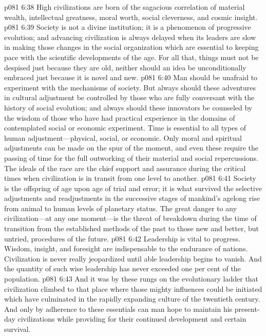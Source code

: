\vs p081 6:38 High civilizations are born of the sagacious correlation of material wealth, intellectual greatness, moral worth, social cleverness, and cosmic insight.
\pc \vs p081 6:39 \bibnobreakspace {} Society is not a divine institution; it is a phenomenon of progressive evolution; and advancing civilization is always delayed when its leaders are slow in making those changes in the social organization which are essential to keeping pace with the scientific developments of the age. For all that, things must not be despised just because they are old, neither should an idea be unconditionally embraced just because it is novel and new.
\vs p081 6:40 Man should be unafraid to experiment with the mechanisms of society. But always should these adventures in cultural adjustment be controlled by those who are fully conversant with the history of social evolution; and always should these innovators be counseled by the wisdom of those who have had practical experience in the domains of contemplated social or economic experiment.  Time is essential to all types of human adjustment---physical, social, or economic. Only moral and spiritual adjustments can be made on the spur of the moment, and even these require the passing of time for the full outworking of their material and social repercussions. The ideals of the race are the chief support and assurance during the critical times when civilization is in transit from one level to another.\plusone
\pc \vs p081 6:41 \bibnobreakspace {} Society is the offspring of age upon age of trial and error; it is what survived the selective adjustments and readjustments in the successive stages of mankind’s agelong rise from animal to human levels of planetary status. The great danger to any civilization---at any one moment---is the threat of breakdown during the time of transition from the established methods of the past to those new and better, but untried, procedures of the future.\plusone
\vs p081 6:42 Leadership is vital to progress. Wisdom, insight, and foresight are indispensable to the endurance of nations. Civilization is never really jeopardized until able leadership begins to vanish. And the quantity of such wise leadership has never exceeded one per cent of the population.\plusone
\vs p081 6:43 And it was by these rungs on the evolutionary ladder that civilization climbed to that place where those mighty influences could be initiated which have culminated in the rapidly expanding culture of the twentieth century. And only by adherence to these essentials can man hope to maintain his present\hyp{}day civilizations while providing for their continued development and certain survival.
